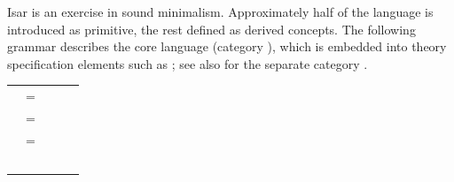\begin{isabellebody}
\begin{isamarkuptext}
  Isar is an exercise in sound minimalism.  Approximately half of the
  language is introduced as primitive, the rest defined as derived
  concepts.  The following grammar describes the core language
  (category ), which is embedded into theory
  specification elements such as \hyperlink{command.theorem}{\mbox{}}; see also
   for the separate category .

  \medskip
  \begin{tabular}{rcl}
    \isa{{\isaliteral{22}{\isachardoublequote}}theory{\isaliteral{5C3C68797068656E3E}{\isasymhyphen}}stmt{\isaliteral{22}{\isachardoublequote}}} & = & \hyperlink{command.theorem}{\mbox{\isa{\isacommand{theorem}}}}~\isa{{\isaliteral{22}{\isachardoublequote}}statement\ proof\ \ {\isaliteral{7C}{\isacharbar}}{\isaliteral{22}{\isachardoublequote}}}~~\hyperlink{command.definition}{\mbox{\isa{\isacommand{definition}}}}~\isa{{\isaliteral{22}{\isachardoublequote}}{\isaliteral{5C3C646F74733E}{\isasymdots}}\ \ {\isaliteral{7C}{\isacharbar}}\ \ {\isaliteral{5C3C646F74733E}{\isasymdots}}{\isaliteral{22}{\isachardoublequote}}} \\[1ex]

    \isa{{\isaliteral{22}{\isachardoublequote}}proof{\isaliteral{22}{\isachardoublequote}}} & = & \isa{{\isaliteral{22}{\isachardoublequote}}prfx\isaliteral{5C3C5E7375703E}{}\isactrlsup {\isaliteral{2A}{\isacharasterisk}}{\isaliteral{22}{\isachardoublequote}}}~\hyperlink{command.proof}{\mbox{\isa{\isacommand{proof}}}}~\isa{{\isaliteral{22}{\isachardoublequote}}method\isaliteral{5C3C5E7375703E}{}\isactrlsup {\isaliteral{3F}{\isacharquery}}\ stmt\isaliteral{5C3C5E7375703E}{}\isactrlsup {\isaliteral{2A}{\isacharasterisk}}{\isaliteral{22}{\isachardoublequote}}}~\hyperlink{command.qed}{\mbox{\isa{\isacommand{qed}}}}~\isa{{\isaliteral{22}{\isachardoublequote}}method\isaliteral{5C3C5E7375703E}{}\isactrlsup {\isaliteral{3F}{\isacharquery}}{\isaliteral{22}{\isachardoublequote}}} \\[1ex]

    \isa{prfx} & = & \hyperlink{command.using}{\mbox{\isa{\isacommand{using}}}}~\isa{{\isaliteral{22}{\isachardoublequote}}facts{\isaliteral{22}{\isachardoublequote}}} \\
    & \isa{{\isaliteral{22}{\isachardoublequote}}{\isaliteral{7C}{\isacharbar}}{\isaliteral{22}{\isachardoublequote}}} & \hyperlink{command.unfolding}{\mbox{\isa{\isacommand{unfolding}}}}~\isa{{\isaliteral{22}{\isachardoublequote}}facts{\isaliteral{22}{\isachardoublequote}}} \\


\end{tabular}
\end{isamarkuptext}
\end{isabellebody}
